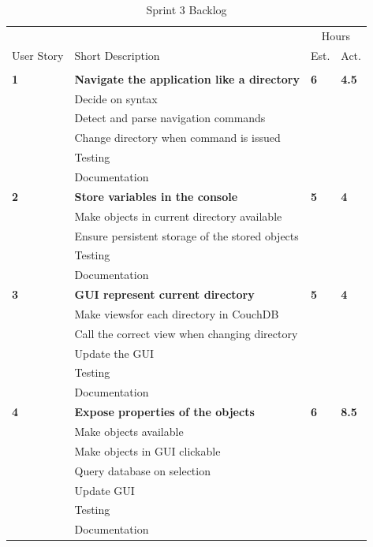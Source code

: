 \begin{table}
\caption{Sprint 3 Backlog}
\centering
\begin{tabular}{ l p{8cm} l l }
\hline 
			&				&\multicolumn{2}{c}{Hours}			\\
 User Story	& Short Description		&Est.		&Act.	                               \\ 
\hline \\ [-2.0ex]
 
\bf{1}     &\bf{Navigate the application like a directory}		&\bf{6}		&\bf{4.5}          \\ 
		  &Decide on syntax						&			&		\\
		  &Detect and parse navigation commands	&			&		\\
		  &Change directory when command is issued&			&		\\
		  &Testing							&			&		\\
		  &Documentation						&			&		\\

 \bf{2}     &\bf{Store variables in the console} 				&\bf{5}		&\bf{4}               \\ 
		  &Make objects in current directory available		&			&		\\
		  &Ensure persistent storage of the stored objects	&			&		\\
		  &Testing								&			&		\\
		  &Documentation							&			&		\\

 \bf{3}     &\bf{GUI represent current directory} 			&\bf{5}		&\bf{4}		     \\ 
		  &Make viewsfor each directory in CouchDB		&			&		\\
		  &Call the correct view when changing directory	&			&		\\
		  &Update the GUI							&			&		\\
		  &Testing								&			&		\\
		  &Documentation							&			&		\\

 \bf{4}   	&\bf{Expose properties of the objects}			&\bf{6}		&\bf{8.5}		     \\ 
		  &Make objects available						&			&		\\
		  &Make objects in GUI clickable				&			&		\\
		  &Query database on selection				&			&		\\
		  &Update GUI								&			&		\\
		  &Testing								&			&		\\
		  &Documentation							&			&		\\


\end{tabular}
\end{table}

